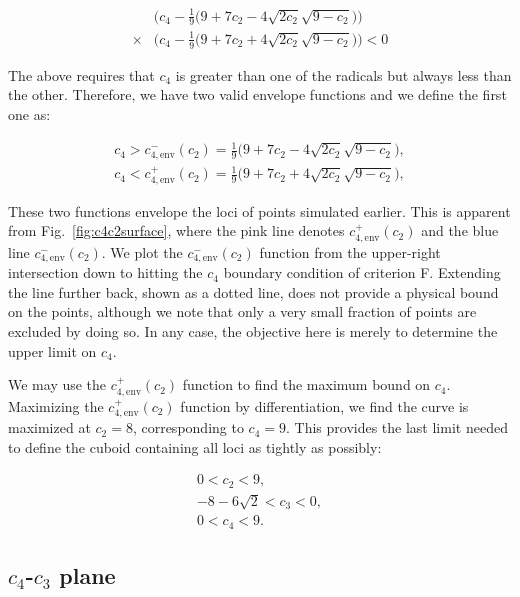 \begin{align}
&\Big( c_4 - \frac{1}{9} \big( 9 + 7c_2 - 4\sqrt{2 c_2} \sqrt{9-c_2} \big) \Big) \nonumber\\
\times &\Big( c_4 - \frac{1}{9} \big( 9 + 7c_2 + 4\sqrt{2 c_2} \sqrt{9-c_2} \big) \Big) < 0
\end{align}

The above requires that $c_4$ is greater than one of the radicals but always 
less than the other. Therefore, we have two valid envelope functions and we 
define the first one as:

\begin{align}
c_4 > c_{4,\mathrm{env}}^{-}(c_2) = \frac{1}{9} \big( 9 + 7c_2 - 4\sqrt{2 c_2} \sqrt{9-c_2} \big), \\
c_4 < c_{4,\mathrm{env}}^{+}(c_2) = \frac{1}{9} \big( 9 + 7c_2 + 4\sqrt{2 c_2} \sqrt{9-c_2} \big),
\end{align}

These two functions envelope the loci of points simulated earlier. This is 
apparent from Fig.~\ref{fig:c4c2surface}, where the pink line denotes 
$c_{4,\mathrm{env}}^{+}(c_2)$ and the blue line $c_{4,\mathrm{env}}^{-}(c_2)$. 
We plot the $c_{4,\mathrm{env}}^{-}(c_2)$ function from the upper-right 
intersection down to hitting the $c_4$ boundary condition of criterion F. 
Extending the line further back, shown as a dotted line, does not provide a 
physical bound on the points, although we note that only a very small fraction 
of points are excluded by doing so. In any case, the objective here is merely to
determine the upper limit on $c_4$.

We may use the $c_{4,\mathrm{env}}^{+}(c_2)$ function to find the maximum 
bound on $c_4$. Maximizing the $c_{4,\mathrm{env}}^{+}(c_2)$ function 
by differentiation, we find the curve is maximized at $c_2=8$, corresponding to
$c_4 = 9$. This provides the last limit needed to define the cuboid containing 
all loci as tightly as possibly:

\begin{align}
0 < c_2 < 9,\nonumber\\
-8-6\sqrt{2} < c_3 < 0,\nonumber\\
0 < c_4 < 9.
\end{align}

\subsection{$c_4$-$c_3$ plane}
\label{sub:c4c3plane}

